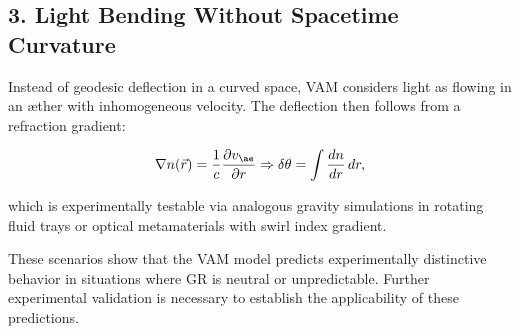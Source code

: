 \subsection*{3. Light Bending Without Spacetime Curvature}

Instead of geodesic deflection in a curved space, VAM considers light as flowing in an æther with inhomogeneous velocity. The deflection then follows from a refraction gradient:

\begin{equation}
    \nabla n(\vec{r}) = \frac{1}{c} \frac{\partial v_{\ae}}{\partial r} \Rightarrow \delta \theta = \int \frac{dn}{dr} \, dr,
\end{equation}

which is experimentally testable via analogous gravity simulations in rotating fluid trays or optical metamaterials with swirl index gradient.

\bigskip

These scenarios show that the VAM model predicts experimentally distinctive behavior in situations where GR is neutral or unpredictable. Further experimental validation is necessary to establish the applicability of these predictions.